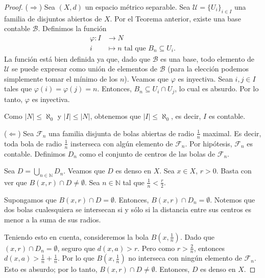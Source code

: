 \begin{proof}
	($\Rightarrow$) Sea $(X, d)$ un espacio métrico separable. Sea $\mathcal{U} = \{ U_i \}_{i \in I}$ una familia de disjuntos abiertos de $X$. Por el Teorema anterior, existe una base contable $\mathcal{B}$. Definimos la función
	\begin{align*}
		\varphi: I & \to  N                                         \\
		i          & \mapsto n \text{ tal que } B_n \subseteq U_i .
	\end{align*}
	La función está bien definida ya que, dado que $\mathcal{B}$ es una base, todo elemento de $\mathcal{U}$ se puede expresar como unión de elementos de $\mathcal{B}$ (para la elección podemos simplemente tomar el mínimo de los $n$). Veamos que $\varphi$ es inyectiva. Sean $i, j \in I$ tales que $\varphi(i) = \varphi(j) = n$. Entonces, $B_n \subseteq U_i \cap  U_j$, lo cual es absurdo. Por lo tanto, $\varphi$ es inyectiva.

	Como $\left| N \right| \leq \aleph_0$ y $\left| I \right| \leq \left| N \right| $, obtenemos que $\left| I \right| \leq \aleph_0$, es decir, $I$ es contable.

	($\Leftarrow$) Sea $\mathcal{F}_n$ una familia disjunta de bolas abiertas de radio $\frac{1}{n}$ maximal. Es decir, toda bola de radio $\frac{1}{n}$ insterseca con algún elemento de $\mathcal{F}_n$. Por hipótesis, $\mathcal{F}_n$ es contable. Definimos $D_n$ como el conjunto de centros de las bolas de $\mathcal{F}_n$.

	Sea $D = \bigcup_{n \in \mathbb{N}} D_n$. Veamos que $D$ es denso en $X$. Sea $x \in X$, $r > 0$. Basta con ver que $B(x, r) \cap D \neq \emptyset$. Sea $n \in \mathbb{N}$ tal que $\frac{1}{n} < \frac{r}{2}$.

	Supongamos que $B(x, r) \cap D = \emptyset$. Entonces, $B(x, r) \cap D_n = \emptyset$. Notemos que dos bolas cualesquiera se intersecan si y sólo si la distancia entre sus centros es menor a la suma de sus radios.

	Teniendo esto en cuenta, consideremos la bola $B(x, \frac{1}{n})$. Dado que $(x, r) \cap D_n = \emptyset$, seguro que $d(x, a) > r$. Pero como $r > \frac{2}{n}$, entonces $d(x, a) > \frac{1}{n} + \frac{1}{n}$. Por lo que $B(x, \frac{1}{n})$ no interseca con ningún elemento de $\mathcal{F}_n$. Esto es absurdo; por lo tanto, $B(x, r) \cap D \neq \emptyset$. Entonces, $D$ es denso en $X$.
\end{proof}


